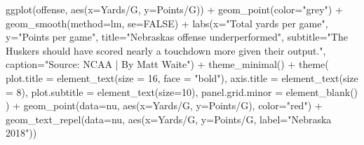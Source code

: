 \documentclass[
  letterpaper,
  DIV=11,
  numbers=noendperiod]{scrreprt}
\newenvironment{Shaded}{\begin{snugshade}}{\end{snugshade}}
\newcommand{\AttributeTok}[1]{\textcolor[rgb]{0.40,0.45,0.13}{#1}}
\newcommand{\ConstantTok}[1]{\textcolor[rgb]{0.56,0.35,0.01}{#1}}
\newcommand{\DecValTok}[1]{\textcolor[rgb]{0.68,0.00,0.00}{#1}}
\newcommand{\FunctionTok}[1]{\textcolor[rgb]{0.28,0.35,0.67}{#1}}
\newcommand{\NormalTok}[1]{\textcolor[rgb]{0.00,0.23,0.31}{#1}}
\newcommand{\SpecialCharTok}[1]{\textcolor[rgb]{0.37,0.37,0.37}{#1}}
\newcommand{\StringTok}[1]{\textcolor[rgb]{0.13,0.47,0.30}{#1}}
\begin{document}
\begin{Shaded}
\begin{Highlighting}[]
\FunctionTok{ggplot}\NormalTok{(offense, }\FunctionTok{aes}\NormalTok{(}\AttributeTok{x=}\StringTok{\textasciigrave{}}\AttributeTok{Yards/G}\StringTok{\textasciigrave{}}\NormalTok{, }\AttributeTok{y=}\StringTok{\textasciigrave{}}\AttributeTok{Points/G}\StringTok{\textasciigrave{}}\NormalTok{)) }\SpecialCharTok{+} 
  \FunctionTok{geom\_point}\NormalTok{(}\AttributeTok{color=}\StringTok{"grey"}\NormalTok{) }\SpecialCharTok{+} \FunctionTok{geom\_smooth}\NormalTok{(}\AttributeTok{method=}\NormalTok{lm, }\AttributeTok{se=}\ConstantTok{FALSE}\NormalTok{) }\SpecialCharTok{+} 
  \FunctionTok{labs}\NormalTok{(}\AttributeTok{x=}\StringTok{"Total yards per game"}\NormalTok{, }\AttributeTok{y=}\StringTok{"Points per game"}\NormalTok{, }\AttributeTok{title=}\StringTok{"Nebraska\textquotesingle{}s offense underperformed"}\NormalTok{, }\AttributeTok{subtitle=}\StringTok{"The Husker\textquotesingle{}s should have scored nearly a touchdown more given their output."}\NormalTok{, }\AttributeTok{caption=}\StringTok{"Source: NCAA | By Matt Waite"}\NormalTok{) }\SpecialCharTok{+} 
  \FunctionTok{theme\_minimal}\NormalTok{() }\SpecialCharTok{+} 
  \FunctionTok{theme}\NormalTok{(}
    \AttributeTok{plot.title =} \FunctionTok{element\_text}\NormalTok{(}\AttributeTok{size =} \DecValTok{16}\NormalTok{, }\AttributeTok{face =} \StringTok{"bold"}\NormalTok{),}
    \AttributeTok{axis.title =} \FunctionTok{element\_text}\NormalTok{(}\AttributeTok{size =} \DecValTok{8}\NormalTok{), }
    \AttributeTok{plot.subtitle =} \FunctionTok{element\_text}\NormalTok{(}\AttributeTok{size=}\DecValTok{10}\NormalTok{), }
    \AttributeTok{panel.grid.minor =} \FunctionTok{element\_blank}\NormalTok{()}
\NormalTok{    ) }\SpecialCharTok{+}
  \FunctionTok{geom\_point}\NormalTok{(}\AttributeTok{data=}\NormalTok{nu, }\FunctionTok{aes}\NormalTok{(}\AttributeTok{x=}\StringTok{\textasciigrave{}}\AttributeTok{Yards/G}\StringTok{\textasciigrave{}}\NormalTok{, }\AttributeTok{y=}\StringTok{\textasciigrave{}}\AttributeTok{Points/G}\StringTok{\textasciigrave{}}\NormalTok{), }\AttributeTok{color=}\StringTok{"red"}\NormalTok{) }\SpecialCharTok{+} 
  \FunctionTok{geom\_text\_repel}\NormalTok{(}\AttributeTok{data=}\NormalTok{nu, }\FunctionTok{aes}\NormalTok{(}\AttributeTok{x=}\StringTok{\textasciigrave{}}\AttributeTok{Yards/G}\StringTok{\textasciigrave{}}\NormalTok{, }\AttributeTok{y=}\StringTok{\textasciigrave{}}\AttributeTok{Points/G}\StringTok{\textasciigrave{}}\NormalTok{, }\AttributeTok{label=}\StringTok{"Nebraska 2018"}\NormalTok{))}
\end{Highlighting}
\end{Shaded}
\end{document}
